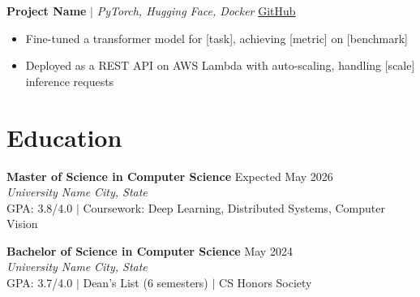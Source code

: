 \documentclass[11pt,letterpaper]{article}
\newcommand{\entry}[4]{%
    \textbf{#1} \hfill #2 \\
    \textit{#3} \hfill \textit{#4}
}
\begin{document}
\vspace{4pt}
\textbf{Project Name} $|$ \textit{PyTorch, Hugging Face, Docker} \hfill \href{https://github.com/yourusername/project}{GitHub}
\begin{itemize}
    \item Fine-tuned a transformer model for [task], achieving [metric] on [benchmark]
    \item Deployed as a REST API on AWS Lambda with auto-scaling, handling [scale] inference requests
\end{itemize}

\section{Education}

\entry{Master of Science in Computer Science}{Expected May 2026}{University Name}{City, State} \\
GPA: 3.8/4.0 \quad $|$ \quad Coursework: Deep Learning, Distributed Systems, Computer Vision

\vspace{4pt}
\entry{Bachelor of Science in Computer Science}{May 2024}{University Name}{City, State} \\
GPA: 3.7/4.0 \quad $|$ \quad Dean's List (6 semesters) \quad $|$ \quad CS Honors Society
\end{document}

